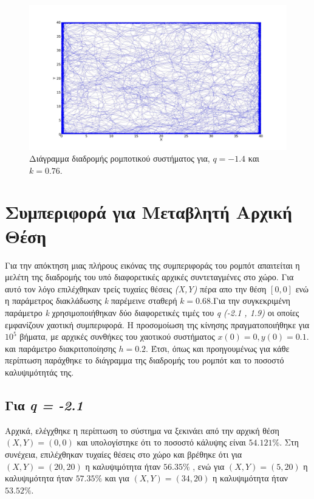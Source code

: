 \begin{figure}[ht]
	\centering
	\includegraphics[width=1\linewidth]{LateX images/log/k/g3-1.4}
	\caption{Διάγραμμα διαδρομής ρομποτικού συστήματος για, $q = -1.4$ και $k = 0.76$.}
	\label{f:g83}	
\end{figure}

\clearpage

\section{Συμπεριφορά για Μεταβλητή Αρχική Θέση}
\label{sec:g2}
Για την απόκτηση μιας πλήρους εικόνας της συμπεριφοράς του ρομπότ απαιτείται η μελέτη της διαδρομής του υπό διαφορετικές αρχικές συντεταγμένες στο χώρο. Για αυτό τον λόγο επιλέχθηκαν  τρείς τυχαίες θέσεις \emph{(X,Y)} πέρα απο την θέση $[0,0]$ ενώ η παράμετρος διακλάδωσης \emph{k} παρέμεινε σταθερή $k = 0.68$.Για την συγκεκριμένη παράμετρο \emph{k} χρησιμοποιήθηκαν δύο διαφορετικές τιμές του \emph{q} \emph{(-2.1 , 1.9)} οι οποίες εμφανίζουν χαοτική συμπεριφορά.
Η προσομοίωση της κίνησης πραγματοποιήθηκε για $10^5$ βήματα, με αρχικές συνθήκες του χαοτικού συστήματος $x(0) = 0,  y(0) = 0.1$. και παράμετρο διακριτοποίησης $h = 0.2$. Έτσι, όπως και προηγουμένως για κάθε περίπτωση παράχθηκε το διάγραμμα της διαδρομής του ρομπότ και το ποσοστό καλυψιμότητάς της.

\subsection{Για \emph{q = -2.1}}

Αρχικά, ελέγχθηκε η περίπτωση το σύστημα να ξεκινάει από την αρχική θέση $(X,Y) = (0,0)$ και υπολογίστηκε ότι το ποσοστό κάλυψης είναι $54.121\%$. Στη συνέχεια, επιλέχθηκαν τυχαίες θέσεις στο χώρο και βρέθηκε ότι για $(X,Y) = (20,20)$ η καλυψιμότητα ήταν $56.35\%$ , ενώ για $(X,Y) = (5,20)$ η καλυψιμότητα ήταν $57.35\%$ και για $(X,Y) = (34,20)$ η καλυψιμότητα ήταν $53.52\%$. 

